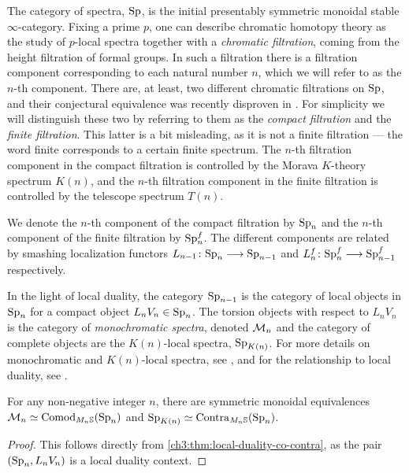 The category of spectra, $\mathrm{Sp}$, is the initial presentably symmetric monoidal stable $\infty$-category. Fixing a prime $p$, one can describe chromatic homotopy theory as the study of $p$-local spectra together with a \emph{chromatic filtration}, coming from the height filtration of formal groups. In such a filtration there is a filtration component corresponding to each natural number $n$, which we will refer to as the $n$-th component. There are, at least, two different chromatic filtrations on $\mathrm{Sp}$, and their conjectural equivalence was recently disproven in \cite{burklund-hahn-levy-schlank_23}. For simplicity we will distinguish these two by referring to them as the \emph{compact filtration} and the \emph{finite filtration}. This latter is a bit misleading, as it is not a finite filtration --- the word finite corresponds to a certain finite spectrum. The $n$-th filtration component in the compact filtration is controlled by the Morava $K$-theory spectrum $K(n)$, and the $n$-th filtration component in the finite filtration is controlled by the telescope spectrum $T(n)$. 

We denote the $n$-th component of the compact filtration by $\mathrm{Sp}_n$ and the $n$-th component of the finite filtration by $\mathrm{Sp}_n^f$. The different components are related by smashing localization functors $L_{n-1}\colon\mathrm{Sp}_n \longrightarrow \mathrm{Sp}_{n-1}$ and $L_n^f\colon \mathrm{Sp}_n^f \longrightarrow \mathrm{Sp}_{n-1}^f$ respectively. 

In the light of local duality, the category $\mathrm{Sp}_{n-1}$ is the category of local objects in $\mathrm{Sp}_n$ for a compact object $L_nV_n \in \mathrm{Sp}_n$. The torsion objects with respect to $L_nV_n$ is the category of \emph{monochromatic spectra}, denoted $\mathcal{M}_{n}$ and the category of complete objects are the $K(n)$-local spectra, $\mathrm{Sp}_{K(n)}$. For more details on monochromatic and $K(n)$-local spectra, see \cite{hovey-strickland_99}, and for the relationship to local duality, see \cite[Section 6.2]{barthel-heard-valenzuela_2018}. 

\begin{proposition}
    For any non-negative integer $n$, there are symmetric monoidal equivalences $\mathcal{M}_{n} \simeq \mathrm{Comod}_{M_n\mathbb{S}}(\mathrm{Sp}_n)$ and $\mathrm{Sp}_{K(n)}\simeq \mathrm{Contra}_{M_n\mathbb{S}}(\mathrm{Sp}_n)$.
\end{proposition}
\begin{proof}
    This follows directly from \cref{ch3:thm:local-duality-co-contra}, as the pair $(\mathrm{Sp}_n, L_nV_n)$ is a local duality context. 
\end{proof}

